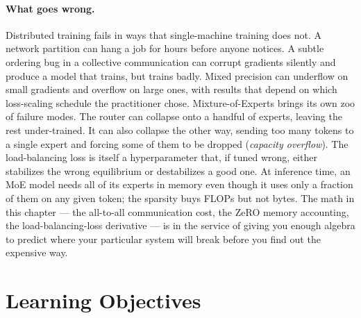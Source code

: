 \paragraph{What goes wrong.}
Distributed training fails in ways that single-machine training does
not. A network partition can hang a job for hours before anyone
notices. A subtle ordering bug in a collective communication can
corrupt gradients silently and produce a model that trains, but
trains badly. Mixed precision can underflow on small gradients and
overflow on large ones, with results that depend on which loss-scaling
schedule the practitioner chose. Mixture-of-Experts brings its own
zoo of failure modes. The router can collapse onto a handful of
experts, leaving the rest under-trained. It can also collapse the
other way, sending too many tokens to a single expert and forcing
some of them to be dropped (\emph{capacity overflow}). The
load-balancing loss is itself a hyperparameter that, if tuned wrong,
either stabilizes the wrong equilibrium or destabilizes a good one.
At inference time, an MoE model needs all of its experts in memory
even though it uses only a fraction of them on any given token; the
sparsity buys FLOPs but not bytes. The math in this chapter --- the
all-to-all communication cost, the ZeRO memory accounting, the
load-balancing-loss derivative --- is in the service of giving you
enough algebra to predict where your particular system will break
before you find out the expensive way.

\section{Learning Objectives}

